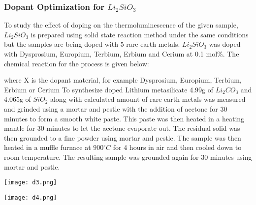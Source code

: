 \documentclass[../experiment.tex]{subfiles}
\begin{document}
    \subsubsection{Dopant Optimization for $Li_2SiO_3$}
        To study the effect of doping on the thermoluminescence of the given sample, $Li_2SiO_3$ is prepared using 
        solid state reaction method under the same conditions but the samples are being doped with 5 rare earth metals.
        $Li_2SiO_3$ was doped with Dysprosium, Europium, Terbium, Erbium and Cerium at 0.1 mol\%. The chemical reaction for 
        the process is given below:
        \begin{center}
        \end{center}
        where X is the dopant material, for example Dysprosium, Europium, Terbium, Erbium or Cerium
        To synthesize doped Lithium metasilicate 4.99g of $Li_2CO_3$ and 4.065g of $SiO_2$ along with calculated 
        amount of rare earth metals was measured and grinded using a mortar and pestle with the addition of 
        acetone for 30 minutes to form a smooth white paste. This paste was then heated in a heating mantle for 
        30 minutes to let the acetone evaporate out. The residual solid was then grounded to a fine powder using 
        mortar and pestle. The sample was then heated in a muffle furnace at $900^{\circ}C$ for 4 hours in air and 
        then cooled down to room temperature. The resulting sample was grounded again for 30 minutes using mortar and pestle.
        \FloatBarrier\begin{multicols}{2}
            \begin{Figure}
                \centering
                \texttt{[image: d3.png]}
                \label{fig:d3}
            \end{Figure}
            \begin{Figure}
                \centering
                \texttt{[image: d4.png]}
                \label{fig:d4}
            \end{Figure}
        \end{multicols}
        
\end{document}

